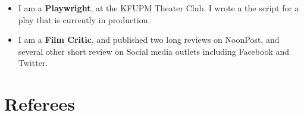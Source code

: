 \documentclass[11pt,a4paper,sans]{moderncv}        %
\begin{document}
\begin{itemize}
\vspace{6pt}

\item{I am a \textbf{Playwright}, at the KFUPM Theater Club. I wrote a the script for a play that is currently in production.}

\vspace{6pt}

\item{I am a \textbf{Film Critic}, and published two long reviews on NoonPost, and several other short review on Social media outlets including Facebook and Twitter.}


\end{itemize}


\section{Referees}
\end{document}
